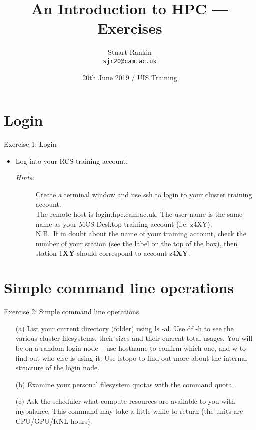 \documentclass{beamer}
\title[An Introduction to HPC --- Exercises] %
{An Introduction to HPC --- Exercises}
\author[SJ Rankin] %
{Stuart Rankin\\ \texttt{sjr20@cam.ac.uk}}
\institute[UIS, University of Cambridge] %
{Research Computing Services (http://www.hpc.cam.ac.uk/)\\
University Information Services (http://www.uis.cam.ac.uk/)}
\date[20/06/2019] %
{20th June 2019 / UIS Training}
\begin{document}
\begin{frame}
  \titlepage
\end{frame}

\section{Login}
\begin{frame}{Exercise 1: Login}
\begin{itemize}
\item{Log into your RCS training account.}
\begin{description}
\item[\emph{Hints:}]{\small Create a terminal window and use \alert{ssh} to login to your cluster training account. \\\smallskip
The remote host is \alert{login.hpc.cam.ac.uk}. The user name is the same name as your MCS Desktop training account (i.e. \alert{z4XY}).\hfill\\\smallskip
{\scriptsize N.B.\ If in doubt about the name of your training account, check the number of your station (see the label on the top of the box), then station 1\textbf{XY} should correspond to account z4\textbf {XY}.}\hfill\\\smallskip
}
\end{description}
\end{itemize}
\end{frame}


\section{Simple command line operations}
\begin{frame}{Exercise 2: Simple command line operations}
\begin{itemize}

\item[(a)]{List your current directory (folder) using \alert{ls -al}. Use \alert{df -h} to see the various cluster filesystems, their sizes and their current total usages. You will be on a random login node -- use \alert{hostname} to confirm which one, and \alert{w} to find out who else is using it. Use \alert{lstopo} to find out more about the internal structure of the login node.}

\item[(b)]{Examine your personal filesystem quotas with the command \alert{quota}.}
 
\item[(c)]{Ask the scheduler what compute resources are available to you with \alert{mybalance}. This command may take a little while to return (the units are CPU/GPU/KNL hours).}

\end{itemize}
\end{frame}
\end{document}
